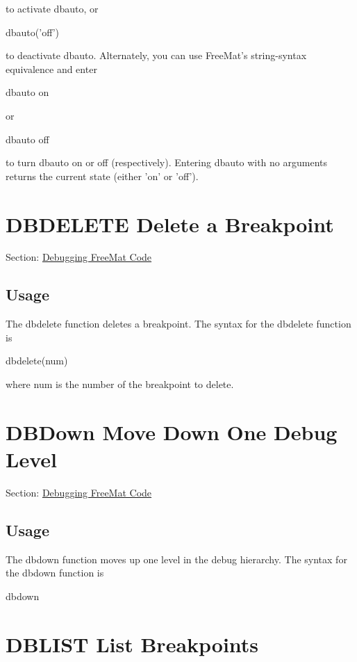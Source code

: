  to activate dbauto, or \begin{DoxyVerb}   dbauto('off')
\end{DoxyVerb}
 to deactivate dbauto. Alternately, you can use Free\-Mat's string-\/syntax equivalence and enter \begin{DoxyVerb}   dbauto on
\end{DoxyVerb}
 or \begin{DoxyVerb}   dbauto off
\end{DoxyVerb}
 to turn dbauto on or off (respectively). Entering {\ttfamily dbauto} with no arguments returns the current state (either 'on' or 'off'). \hypertarget{debug_dbdelete}{}\section{D\-B\-D\-E\-L\-E\-T\-E Delete a Breakpoint}\label{debug_dbdelete}
Section\-: \hyperlink{sec_debug}{Debugging Free\-Mat Code} \hypertarget{vtkwidgets_vtkxyplotwidget_Usage}{}\subsection{Usage}\label{vtkwidgets_vtkxyplotwidget_Usage}
The {\ttfamily dbdelete} function deletes a breakpoint. The syntax for the {\ttfamily dbdelete} function is \begin{DoxyVerb}  dbdelete(num)
\end{DoxyVerb}
 where {\ttfamily num} is the number of the breakpoint to delete. \hypertarget{debug_dbdown}{}\section{D\-B\-Down Move Down One Debug Level}\label{debug_dbdown}
Section\-: \hyperlink{sec_debug}{Debugging Free\-Mat Code} \hypertarget{vtkwidgets_vtkxyplotwidget_Usage}{}\subsection{Usage}\label{vtkwidgets_vtkxyplotwidget_Usage}
The {\ttfamily dbdown} function moves up one level in the debug hierarchy. The syntax for the {\ttfamily dbdown} function is \begin{DoxyVerb} dbdown
\end{DoxyVerb}
 \hypertarget{debug_dblist}{}\section{D\-B\-L\-I\-S\-T List Breakpoints}\label{debug_dblist}
